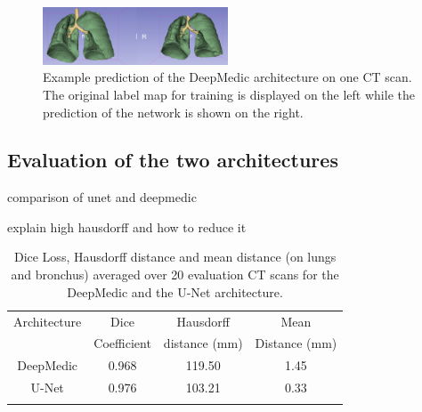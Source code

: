 \begin{figure}[h!]
	\includegraphics[width=0.49\textwidth, angle=0]{files/predunet.png}
	\caption{Example prediction of the DeepMedic architecture on one CT scan. The original label map for training is displayed on the left while the prediction of the network is shown on the right.}
	\label{pred_unet}
\end{figure}


\subsection{Evaluation of the two architectures}


comparison of unet and deepmedic

explain high hausdorff and how to reduce it


\begin{table}[h!]
	\centering
	\setlength{\tabcolsep}{10pt}
	\renewcommand{\arraystretch}{1.5}
	\begin{tabular}{c c c c}
		\hline 
		Architecture & Dice & Hausdorff & Mean \\
		& Coefficient & distance (mm) & Distance (mm) \\ 
		\hline 
		DeepMedic & 0.968 & 119.50 & 1.45 \\ 
		U-Net & 0.976 & 103.21 & 0.33 \\ 
		\hline
		\newline 
	\end{tabular}
	\caption{Dice Loss, Hausdorff distance and mean distance (on lungs and bronchus) averaged over 20 evaluation CT scans for the DeepMedic and the U-Net architecture.}
	\label{table_result}
\end{table}
